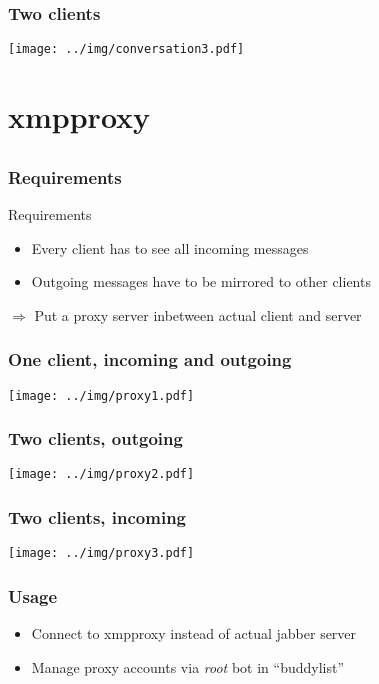 \documentclass[notes=hide,yellow]{beamer}
\begin{document}
	\begin{frame}
		\frametitle{Two clients}
		\texttt{[image: ../img/conversation3.pdf]}
	\end{frame}
	
	\section{xmpproxy}
	\subsection*{}
	\begin{frame}
		\frametitle{Requirements}
		\begin{block}{Requirements}
			\begin{itemize}
					\item Every client has to see all incoming messages
					\item Outgoing messages have to be mirrored to other clients
			\end{itemize}
		\end{block}
		$\Rightarrow$ Put a proxy server inbetween actual client and server
	\end{frame}
	
	\begin{frame}
		\frametitle{One client, incoming and outgoing}
		\texttt{[image: ../img/proxy1.pdf]}
	\end{frame}
	
	\begin{frame}
		\frametitle{Two clients, outgoing}
		\texttt{[image: ../img/proxy2.pdf]}
	\end{frame}
	
	\begin{frame}
		\frametitle{Two clients, incoming}
		\texttt{[image: ../img/proxy3.pdf]}
	\end{frame}

	\begin{frame}
		\frametitle{Usage}
		\begin{itemize}
			\item Connect to xmpproxy instead of actual jabber server
			\item Manage proxy accounts via \textit{root} bot in ``buddylist''

		\end{itemize}
	\end{frame}
\end{document}
